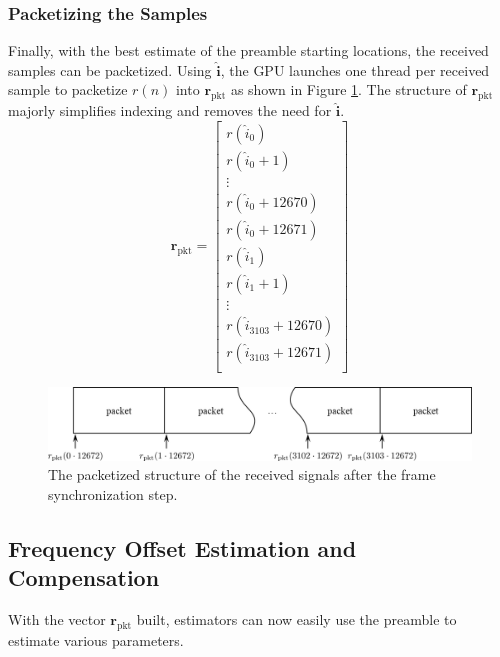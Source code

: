 \clearpage
\subsubsection{Packetizing the Samples}
Finally, with the best estimate of the preamble starting locations, the received samples can be packetized.
Using $\hat{\mathbf{i}}$, the GPU launches one thread per received sample to packetize $r(n)$ into $\mathbf{r}_\text{pkt}$ as shown in Figure \ref{fig:packetized}. 
The structure of $\mathbf{r}_\text{pkt}$ majorly simplifies indexing and removes the need for $\hat{\mathbf{i}}$.
\begin{equation}
\mathbf{r}_\text{pkt} = 
\begin{bmatrix}
r(\hat{i}_0) 			\\
r(\hat{i}_0+1) 		\\
\vdots			\\
r(\hat{i}_0+12670)\\
r(\hat{i}_0+12671)\\
r(\hat{i}_1) 			\\
r(\hat{i}_1+1) 		\\
\vdots			\\
r(\hat{i}_{3103}+12670)\\
r(\hat{i}_{3103}+12671)\\
\end{bmatrix}
\end{equation}
\begin{figure}
	\centering\includegraphics[width=\textwidth/10*9]{figures/gpu/packetized.png}
	\caption{The packetized structure of the received signals after the frame synchronization step.}
	\label{fig:packetized}
\end{figure}

\subsection{Frequency Offset Estimation and Compensation}
\label{sec:frequency_offset_estimation_and_compensation}
With the vector $\mathbf{r}_\text{pkt}$ built, estimators can now easily use the preamble to estimate various parameters.

